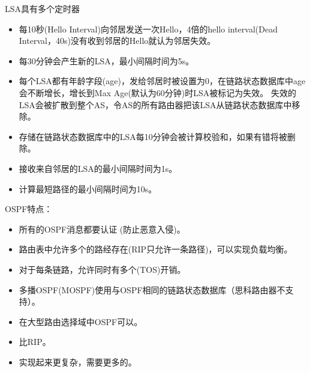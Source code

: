 \myhline
LSA具有多个定时器
\begin{itemize}
	\item 每10秒(Hello Interval)向邻居发送一次Hello，4倍的hello interval(Dead Interval，40s)没有收到邻居的Hello就认为邻居失效。
	\item 每30分钟会产生新的LSA，最小间隔时间为5s。
	\item 每个LSA都有年龄字段(age)，发给邻居时被设置为0，在链路状态数据库中age会不断增长，增长到Max Age(默认为60分钟)时LSA被标记为失效。
	失效的LSA会被扩散到整个AS，令AS的所有路由器把该LSA从链路状态数据库中移除。
	\item 存储在链路状态数据库中的LSA每10分钟会被计算校验和，如果有错将被删除。
	\item 接收来自邻居的LSA的最小间隔时间为1s。
	\item 计算最短路径的最小间隔时间为10s。
\end{itemize}

\myhline
OSPF特点：
\begin{itemize}
	\item 所有的OSPF消息都要认证 (防止恶意入侵)。
	\item 路由表中允许多个的路经存在(RIP只允许一条路径)，可以实现负载均衡。
	\item 对于每条链路，允许同时有多个(TOS)开销。
	\item 多播OSPF(MOSPF)使用与OSPF相同的链路状态数据库（思科路由器不支持）。
	\item 在大型路由选择域中OSPF可以。
	\item 比RIP。
	\item 实现起来更复杂，需要更多的。
\end{itemize}

